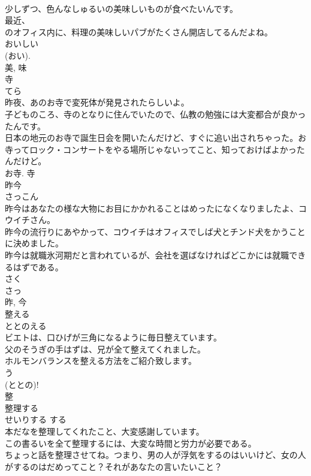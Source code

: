 \documentclass[8pt]{extreport}
\begin{document}
\begin{CJK}{UTF8}{min}
\\	少しずつ、色んなしゅるいの美味しいものが食べたいんです。	
\\	最近、
\\	のオフィス内に、料理の美味しいパブがたくさん開店してるんだよね。	
\\	おいしい 
\\	(おい). 
\\	美, 味	
\\	寺	
\\	てら	
\\	昨夜、あのお寺で変死体が発見されたらしいよ。	
\\	子どものころ、寺のとなりに住んでいたので、仏教の勉強には大変都合が良かったんです。	
\\	日本の地元のお寺で誕生日会を開いたんだけど、すぐに追い出されちゃった。お寺ってロック・コンサートをやる場所じゃないってこと、知っておけばよかったんだけど。	
\\	お寺.	寺	
\\	昨今	
\\	さっこん	
\\	昨今はあなたの様な大物にお目にかかれることはめったになくなりましたよ、コウイチさん。	
\\	昨今の流行りにあやかって、コウイチはオフィスでしば犬とチンド犬をかうことに決めました。	
\\	昨今は就職氷河期だと言われているが、会社を選ばなければどこかには就職できるはずである。	
\\	さく 
\\	さっ 
\\	昨, 今	
\\	整える	
\\	ととのえる	
\\	ビエトは、口ひげが三角になるように毎日整えています。	
\\	父のそうぎの手はずは、兄が全て整えてくれました。	
\\	ホルモンバランスを整える方法をご紹介致します。	
\\	う 
\\	(ととの)!
\\	整	
\\	整理する	
\\	せいりする	する 
\\	本だなを整理してくれたこと、大変感謝しています。	
\\	この書るいを全て整理するには、大変な時間と労力が必要である。	
\\	ちょっと話を整理させてね。つまり、男の人が浮気をするのはいいけど、女の人がするのはだめってこと？それがあなたの言いたいこと？	

\end{CJK}
\end{document}
